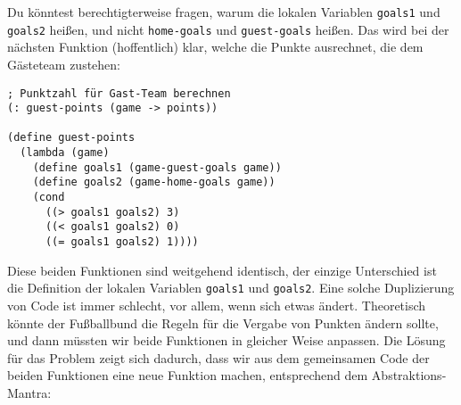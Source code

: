 %
Du könntest berechtigterweise fragen, warum die lokalen Variablen
\lstinline{goals1} und \lstinline{goals2} heißen, und nicht
\lstinline{home-goals} und \lstinline{guest-goals} heißen.  Das wird
bei der nächsten Funktion (hoffentlich) klar, welche die Punkte
ausrechnet, die dem Gästeteam zustehen:
%
\begin{lstlisting}
; Punktzahl für Gast-Team berechnen
(: guest-points (game -> points))

(define guest-points
  (lambda (game)
    (define goals1 (game-guest-goals game))
    (define goals2 (game-home-goals game))
    (cond
      ((> goals1 goals2) 3)
      ((< goals1 goals2) 0)
      ((= goals1 goals2) 1))))
\end{lstlisting}
%
Diese beiden Funktionen sind weitgehend identisch, der einzige
Unterschied ist die Definition der lokalen Variablen
\lstinline{goals1} und \lstinline{goals2}. Eine solche Duplizierung
von Code ist immer schlecht, vor allem, wenn sich etwas
ändert. Theoretisch könnte der Fußballbund die Regeln für die Vergabe
von Punkten ändern sollte, und dann müssten wir beide Funktionen in
gleicher Weise anpassen.  Die Lösung für das Problem zeigt sich
dadurch, dass wir aus dem gemeinsamen Code der beiden Funktionen
eine neue Funktion machen, entsprechend dem Abstraktions-Mantra:

\mantraabstraktion*

